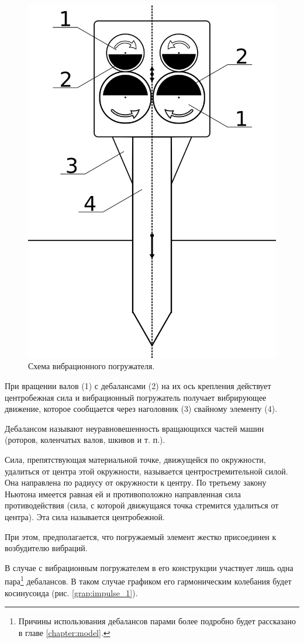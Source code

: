 \begin{figure}[h]
    \centering
    \includegraphics[width=0.5\linewidth]{img/scheme_porg_2.png}
    \caption{Схема вибрационного погружателя.}
    \label{fig:scheme_porg}
\end{figure}

При вращении валов (1) с дебалансами (2) на их ось крепления действует центробежная сила и вибрационный погружатель получает вибрирующее движение,
которое сообщается через наголовник (3) свайному элементу (4).

\begin{definition}
    Дебалансом называют неуравновешенность вращающихся частей машин (роторов, коленчатых валов, шкивов и т. п.).
\end{definition}

\begin{definition}
    Сила, препятствующая материальной точке, движущейся по окружности, удалиться от центра этой окружности,
    называется центростремительной силой. Она направлена по радиусу от окружности к центру.
    По третьему закону Ньютона имеется равная ей и противоположно направленная сила противодействия
    (сила, с которой движущаяся точка стремится удалиться от центра). Эта сила называется центробежной.
\end{definition}

При этом, предполагается, что погружаемый элемент жестко присоединен к возбудителю вибраций.

В случае с вибрационным погружателем в его конструкции участвует лишь одна
пара\footnote{Причины использования дебалансов парами более подробно будет рассказано в главе \ref{chapter:model}.} дебалансов.
В таком случае графиком его гармоническим колебания будет косинусоида (рис. \ref{grap:impulse_1}).

